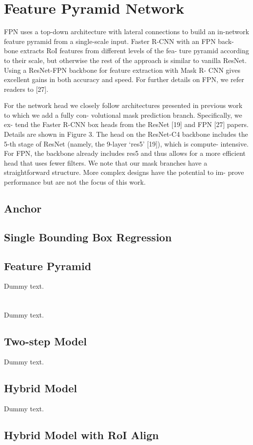 \section{Feature Pyramid Network}\label{modfpn}

FPN uses a top-down architecture with lateral connections to build an in-network feature pyramid from a single-scale input. Faster R-CNN with an FPN back- bone extracts RoI features from different levels of the fea- ture pyramid according to their scale, but otherwise the rest of the approach is similar to vanilla ResNet. Using a ResNet-FPN backbone for feature extraction with Mask R- CNN gives excellent gains in both accuracy and speed. For further details on FPN, we refer readers to [27].

For the network head we closely follow architectures presented in previous work to which we add a fully con- volutional mask prediction branch. Specifically, we ex- tend the Faster R-CNN box heads from the ResNet [19] and FPN [27] papers. Details are shown in Figure 3. The head on the ResNet-C4 backbone includes the 5-th stage of ResNet (namely, the 9-layer ‘res5’ [19]), which is compute- intensive. For FPN, the backbone already includes res5 and thus allows for a more efficient head that uses fewer filters.
We note that our mask branches have a straightforward structure. More complex designs have the potential to im- prove performance but are not the focus of this work.


\subsection{Anchor}

\subsection{Single Bounding Box Regression}

\subsection{Feature Pyramid}

Dummy text.

\section{\modelnameshort}\label{modmer}

Dummy text.

\subsection{Two-step Model}

Dummy text.

\subsection{Hybrid Model}

Dummy text.

\subsection{Hybrid Model with RoI Align}




